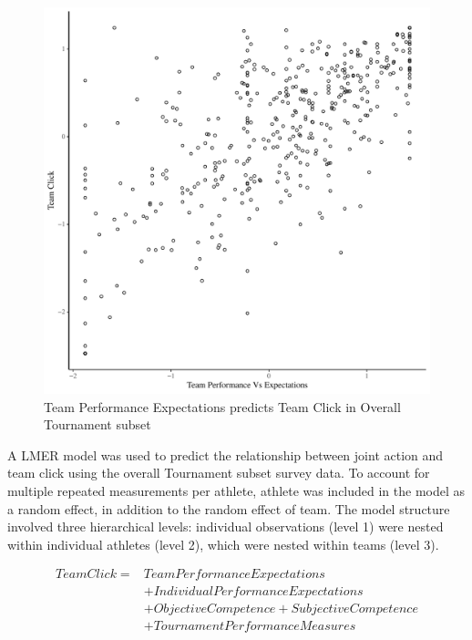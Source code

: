 \begin{landscape}
\begin{figure}[htbp]
\includegraphics[width = \linewidth]{images/teamPerfClickOverallBasicXY.pdf}
  \caption{Team Performance Expectations predicts Team Click in Overall Tournament subset}
  \label{fig:teamPerfClickOverallBasicXY}
\end{figure}

A LMER model was used to predict the relationship between joint action and team click using the overall Tournament subset survey data.  To account for multiple repeated measurements per athlete, athlete was included in the model as a random effect, in addition to the random effect of team.  The model structure involved three hierarchical levels: individual observations (level 1) were nested within individual athletes (level 2), which were nested within teams (level 3).

     \begin{equation}
       \begin{align*}
         Team Click =  & Team Performance Expectations  \\
                   &+ Individual Performance Expectations   \\
                   &+ Objective Competence + Subjective Competence \\
                   &+ TournamentPerformanceMeasures  \\
       \end{align*}
     \end{equation}
     \bigskip


\end{landscape}
